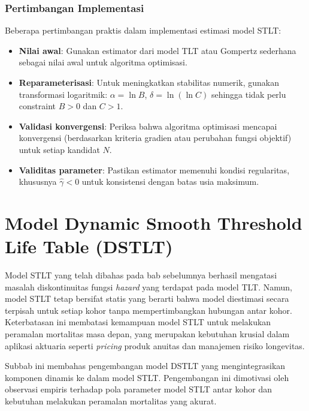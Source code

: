 \subsubsection{Pertimbangan Implementasi}

Beberapa pertimbangan praktis dalam implementasi estimasi model STLT:

\begin{itemize}
    \item \textbf{Nilai awal}: Gunakan estimator dari model TLT atau Gompertz sederhana sebagai nilai awal untuk algoritma optimisasi.
    
    \item \textbf{Reparameterisasi}: Untuk meningkatkan stabilitas numerik, gunakan transformasi logaritmik: $\alpha = \ln B$, $\delta = \ln(\ln C)$ sehingga tidak perlu constraint $B > 0$ dan $C > 1$.
    
    \item \textbf{Validasi konvergensi}: Periksa bahwa algoritma optimisasi mencapai konvergensi (berdasarkan kriteria gradien atau perubahan fungsi objektif) untuk setiap kandidat $N$.
    
    \item \textbf{Validitas parameter}: Pastikan estimator memenuhi kondisi regularitas, khususnya $\hat{\gamma} < 0$ untuk konsistensi dengan batas usia maksimum.
\end{itemize}

\section{Model Dynamic Smooth Threshold Life Table (DSTLT)}

Model STLT yang telah dibahas pada bab sebelumnya berhasil mengatasi masalah diskontinuitas fungsi \textit{hazard} yang terdapat pada model TLT. Namun, model STLT tetap bersifat statis yang berarti bahwa model  diestimasi secara terpisah untuk setiap kohor tanpa mempertimbangkan hubungan antar kohor. Keterbatasan ini membatasi kemampuan model STLT untuk melakukan peramalan mortalitas masa depan, yang merupakan kebutuhan krusial dalam aplikasi aktuaria seperti \textit{pricing} produk anuitas dan manajemen risiko longevitas.

Subbab ini membahas pengembangan model DSTLT yang mengintegrasikan komponen dinamis ke dalam model STLT. Pengembangan ini dimotivasi oleh observasi empiris terhadap pola parameter model STLT antar kohor dan kebutuhan melakukan peramalan mortalitas yang akurat.

